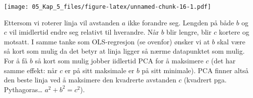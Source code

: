 \documentclass[
]{article}
\newenvironment{Shaded}{\begin{snugshade}}{\end{snugshade}}
\newcommand{\AttributeTok}[1]{\textcolor[rgb]{0.77,0.63,0.00}{#1}}
\newcommand{\CommentTok}[1]{\textcolor[rgb]{0.56,0.35,0.01}{\textit{#1}}}
\newcommand{\DecValTok}[1]{\textcolor[rgb]{0.00,0.00,0.81}{#1}}
\newcommand{\FloatTok}[1]{\textcolor[rgb]{0.00,0.00,0.81}{#1}}
\newcommand{\FunctionTok}[1]{\textcolor[rgb]{0.00,0.00,0.00}{#1}}
\newcommand{\NormalTok}[1]{#1}
\newcommand{\SpecialCharTok}[1]{\textcolor[rgb]{0.00,0.00,0.00}{#1}}
\newcommand{\StringTok}[1]{\textcolor[rgb]{0.31,0.60,0.02}{#1}}
\begin{document}
\begin{Shaded}
\end{Shaded}

\texttt{[image: 05\_Kap\_5\_files/figure-latex/unnamed-chunk-16-1.pdf]}

Ettersom vi roterer linja vil avstanden \(a\) ikke forandre seg. Lengden på både \(b\) og \(c\) vil imidlertid endre seg relativt til hverandre. Når \(b\) blir lengre, blir \(c\) kortere og motsatt. I samme tanke som OLS-regresjon (se ovenfor) ønsker vi at \(b\) skal være så kort som mulig da det betyr at linja ligger så nærme datapunktet som mulig. For å få \(b\) så kort som mulig jobber iidlertid PCA for å maksimere \(c\) (det har samme effekt: når \(c\) er på sitt maksimale er \(b\) på sitt minimale). PCA finner altså den beste linja ved å maksimere den kvadrerte avstanden \(c\) (kvadrert pga. Pythagoras\ldots{} \(a^2 + b^2 = c^2\)).
\end{document}
